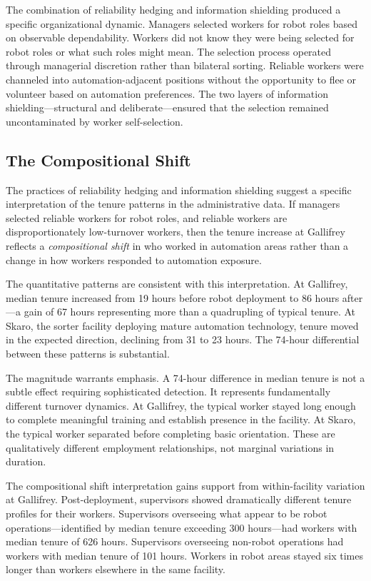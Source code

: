 \documentclass[12pt]{article}
\begin{document}
The combination of reliability hedging and information shielding produced a specific organizational dynamic. Managers selected workers for robot roles based on observable dependability. Workers did not know they were being selected for robot roles or what such roles might mean. The selection process operated through managerial discretion rather than bilateral sorting. Reliable workers were channeled into automation-adjacent positions without the opportunity to flee or volunteer based on automation preferences. The two layers of information shielding---structural and deliberate---ensured that the selection remained uncontaminated by worker self-selection.

\subsection{The Compositional Shift}

The practices of reliability hedging and information shielding suggest a specific interpretation of the tenure patterns in the administrative data. If managers selected reliable workers for robot roles, and reliable workers are disproportionately low-turnover workers, then the tenure increase at Gallifrey reflects a \textit{compositional shift} in who worked in automation areas rather than a change in how workers responded to automation exposure.

The quantitative patterns are consistent with this interpretation. At Gallifrey, median tenure increased from 19 hours before robot deployment to 86 hours after---a gain of 67 hours representing more than a quadrupling of typical tenure. At Skaro, the sorter facility deploying mature automation technology, tenure moved in the expected direction, declining from 31 to 23 hours. The 74-hour differential between these patterns is substantial.

The magnitude warrants emphasis. A 74-hour difference in median tenure is not a subtle effect requiring sophisticated detection. It represents fundamentally different turnover dynamics. At Gallifrey, the typical worker stayed long enough to complete meaningful training and establish presence in the facility. At Skaro, the typical worker separated before completing basic orientation. These are qualitatively different employment relationships, not marginal variations in duration.

The compositional shift interpretation gains support from within-facility variation at Gallifrey. Post-deployment, supervisors showed dramatically different tenure profiles for their workers. Supervisors overseeing what appear to be robot operations---identified by median tenure exceeding 300 hours---had workers with median tenure of 626 hours. Supervisors overseeing non-robot operations had workers with median tenure of 101 hours. Workers in robot areas stayed six times longer than workers elsewhere in the same facility.
\end{document}
